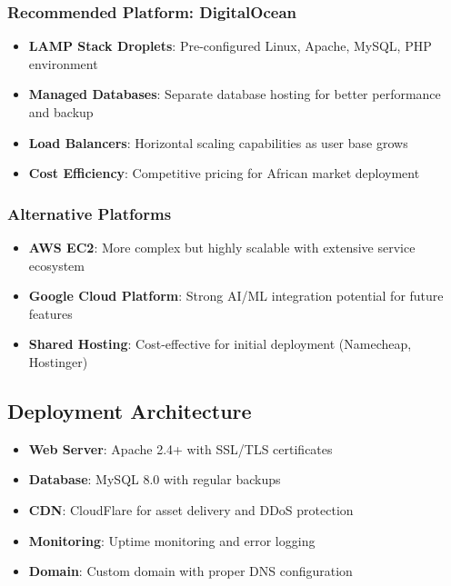\documentclass[12pt,a4paper]{article}
\begin{document}
\subsubsection{Recommended Platform: DigitalOcean}
\begin{itemize}
    \item \textbf{LAMP Stack Droplets}: Pre-configured Linux, Apache, MySQL, PHP environment
    \item \textbf{Managed Databases}: Separate database hosting for better performance and backup
    \item \textbf{Load Balancers}: Horizontal scaling capabilities as user base grows
    \item \textbf{Cost Efficiency}: Competitive pricing for African market deployment
\end{itemize}

\subsubsection{Alternative Platforms}
\begin{itemize}
    \item \textbf{AWS EC2}: More complex but highly scalable with extensive service ecosystem
    \item \textbf{Google Cloud Platform}: Strong AI/ML integration potential for future features
    \item \textbf{Shared Hosting}: Cost-effective for initial deployment (Namecheap, Hostinger)
\end{itemize}

\subsection{Deployment Architecture}

\begin{tcolorbox}[colback=orange!5!white,colframe=orange!75!black,title=Production Environment]
\begin{itemize}
    \item \textbf{Web Server}: Apache 2.4+ with SSL/TLS certificates
    \item \textbf{Database}: MySQL 8.0 with regular backups
    \item \textbf{CDN}: CloudFlare for asset delivery and DDoS protection
    \item \textbf{Monitoring}: Uptime monitoring and error logging
    \item \textbf{Domain}: Custom domain with proper DNS configuration
\end{itemize}
\end{tcolorbox}
\end{document}
